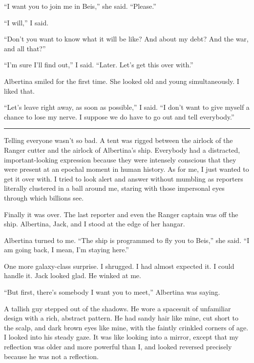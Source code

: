 \documentclass[english,11pt,letterpaper,onecolumn]{scrbook}
\begin{document}
	``I want you to join me in Beis,'' she said.  ``Please.''

	``I will,'' I said.

	``Don't you want to know what it will be like?  And about my debt?  And the war, and all that?''

	``I'm sure I'll find out,'' I said.  ``Later.  Let's get this over with.''

	Albertina smiled for the first time.  She looked old and young simultaneously.  I liked that.

	``Let's leave right away, as soon as possible,'' I said.  ``I don't want to give myself a chance to lose my nerve.  I suppose we do have to go out and tell everybody.''

\begin{center}\rule[3pt]{2in}{0.5pt}\end{center}

	Telling everyone wasn't so bad.  A tent was rigged between the airlock of the Ranger cutter and the airlock of Albertina's ship.  Everybody had a distracted, important-looking expression because they were intensely conscious that they were present at an epochal moment in human history.  As for me, I just wanted to get it over with.  I tried to look alert and answer without mumbling as reporters literally clustered in a ball around me, staring with those impersonal eyes through which billions see.

	Finally it was over.  The last reporter and even the Ranger captain was off the ship.  Albertina, Jack, and I stood at the edge of her hangar.

	Albertina turned to me.  ``The ship is programmed to fly you to Beis,'' she said.  ``I am going back, I mean, I'm staying here.''

	One more galaxy-class surprise.  I shrugged.  I had almost expected it.  I could handle it.  Jack looked glad.  He winked at me.

	``But first, there's somebody I want you to meet,'' Albertina was saying.

	A tallish guy stepped out of the shadows.  He wore a spacesuit of unfamiliar design with a rich, abstract pattern.  He had sandy hair like mine, cut short to the scalp, and dark brown eyes like mine, with the faintly crinkled corners of age.  I looked into his steady gaze.  It was like looking into a mirror, except that my reflection was older and more powerful than I, and looked reversed precisely because he was not a reflection.
\end{document}
